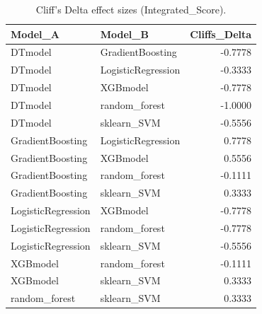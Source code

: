 \begin{table}[t]
\centering
\begin{tabular}{llr}
\toprule
Model_A & Model_B & Cliffs_Delta \\
\midrule
DTmodel & GradientBoosting & -0.7778 \\
DTmodel & LogisticRegression & -0.3333 \\
DTmodel & XGBmodel & -0.7778 \\
DTmodel & random_forest & -1.0000 \\
DTmodel & sklearn_SVM & -0.5556 \\
GradientBoosting & LogisticRegression & 0.7778 \\
GradientBoosting & XGBmodel & 0.5556 \\
GradientBoosting & random_forest & -0.1111 \\
GradientBoosting & sklearn_SVM & 0.3333 \\
LogisticRegression & XGBmodel & -0.7778 \\
LogisticRegression & random_forest & -0.7778 \\
LogisticRegression & sklearn_SVM & -0.5556 \\
XGBmodel & random_forest & -0.1111 \\
XGBmodel & sklearn_SVM & 0.3333 \\
random_forest & sklearn_SVM & 0.3333 \\
\bottomrule
\end{tabular}
\caption{Cliff's Delta effect sizes (Integrated_Score).}
\label{tab:cliffs_Integrated_Score}
\end{table}